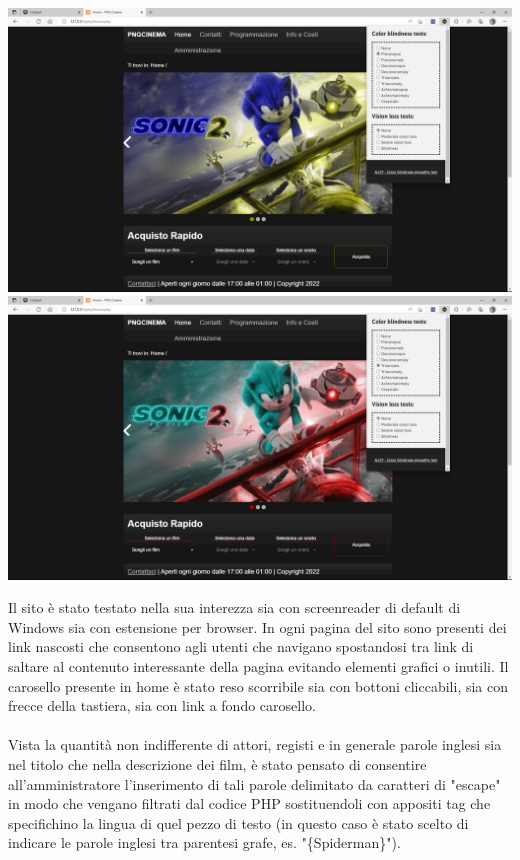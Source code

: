 \documentclass[a4paper, 12pt]{article}
\begin{document}
\begin{center}
    \includegraphics[scale=0.1]{protanopia}
    \includegraphics[scale=0.1]{tritanopia}
\end{center}

Il sito è stato testato nella sua interezza sia con screenreader di default di Windows sia con estensione per browser.
In ogni pagina del sito sono presenti dei link nascosti che consentono agli utenti che navigano spostandosi tra link di saltare al contenuto interessante della pagina evitando elementi grafici o inutili.
Il carosello presente in home è stato reso scorribile sia con bottoni cliccabili, sia con frecce della tastiera, sia con link a fondo carosello.
\\\\
Vista la quantità non indifferente di attori, registi e in generale parole inglesi sia nel titolo che nella descrizione dei film, è stato pensato di consentire all'amministratore l'inserimento di tali parole delimitato da caratteri di "escape" in modo che vengano filtrati dal codice PHP sostituendoli con appositi tag che specifichino la lingua di quel pezzo di testo (in questo caso è stato scelto di indicare le parole inglesi tra parentesi grafe, es. "\{Spiderman\}").
\end{document}
